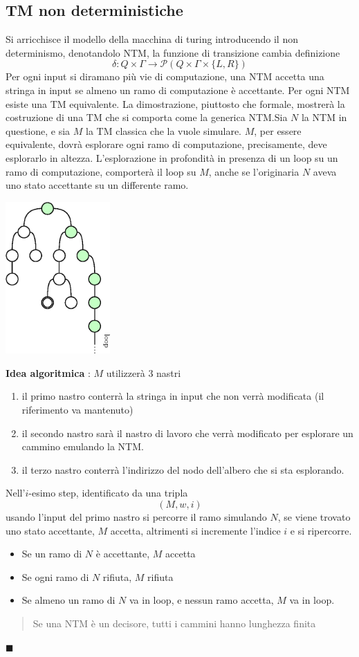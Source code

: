 \documentclass[10pt, letterpaper]{report}
\begin{document}
\subsection{TM non deterministiche}
Si arricchisce il modello della macchina di turing introducendo il non determinismo, denotandolo NTM, la funzione di transizione cambia definizione 
$$ \delta : Q\times\Gamma \rightarrow \mathcal{P}(Q\times \Gamma \times \{L,R\})$$
Per ogni input si diramano più vie di computazione, una NTM accetta una stringa in input se almeno un ramo di computazione è accettante.\acc 
{} Per ogni NTM esiste una TM equivalente.\acc 
\dimo{} La dimostrazione, piuttosto che formale, mostrerà la costruzione di una 
TM che si comporta come la generica NTM.\acc Sia $N$ la NTM in questione, e sia $M$ la TM classica che la vuole 
simulare. $M$, per essere equivalente, dovrà esplorare ogni ramo di computazione, precisamente, deve esplorarlo in altezza. L'esplorazione in profondità in presenza di un loop su un ramo di computazione, comporterà il loop su $M$, anche se l'originaria $N$ aveva uno stato accettante su un differente ramo. \begin{center}
    \includegraphics[width=0.3\textwidth ]{images/loopEAccettante.eps} 
\end{center}
\textbf{Idea algoritmica} : $M$ utilizzerà 3 nastri\begin{enumerate}
    \item il primo nastro conterrà la stringa in input che non verrà modificata (il riferimento va mantenuto)
    \item il secondo nastro sarà il nastro di lavoro che verrà modificato per esplorare un cammino emulando la NTM.
    \item il terzo nastro conterrà l'indirizzo del nodo 
    dell'albero che si sta esplorando.
\end{enumerate}
Nell'$i$-esimo step, identificato da una tripla 
$$ (M,w,i)$$
usando l'input del primo nastro si percorre il ramo simulando $N$, se viene trovato uno stato accettante, 
$M$ accetta, altrimenti si incremente l'indice $i$
 e si ripercorre.
 \begin{itemize}
    \item Se un ramo di $N$ è accettante, $M$ accetta 
    \item Se ogni ramo di $N$ rifiuta, $M$ rifiuta 
    \item Se almeno un ramo di $N$ va in loop, e nessun 
    ramo accetta, $M$ va in loop.
 \end{itemize}
 \begin{quote}
    Se una NTM è un decisore, tutti i cammini hanno lunghezza finita
 \end{quote}
 \hfill$\blacksquare$
\end{document}
